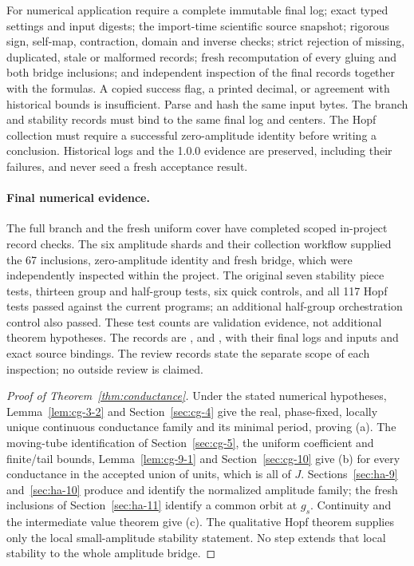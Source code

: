 \documentclass[11pt]{article}
\theoremstyle{definition}
\begin{document}
For numerical application require a complete immutable final log; exact typed settings and input digests; the import-time scientific source snapshot; rigorous sign, self-map, contraction, domain and inverse checks; strict rejection of missing, duplicated, stale or malformed records; fresh recomputation of every gluing and both bridge inclusions; and independent inspection of the final records together with the formulas. A copied success flag, a printed decimal, or agreement with historical bounds is insufficient. Parse and hash the same input bytes. The branch and stability records must bind to the same final log and centers. The Hopf collection must require a successful zero-amplitude identity before writing a conclusion. Historical logs and the 1.0.0 evidence are preserved, including their failures, and never seed a fresh acceptance result.

\paragraph{Final numerical evidence.} The full branch and the fresh uniform cover have completed scoped in-project record checks. The six amplitude shards and their collection workflow supplied the 67 inclusions, zero-amplitude identity and fresh bridge, which were independently inspected within the project. The original seven stability piece tests, thirteen group and half-group tests, six quick controls, and all 117 Hopf tests passed against the current programs; an additional half-group orchestration control also passed. These test counts are validation evidence, not additional theorem hypotheses. The records are ,  and , with their final logs and inputs and exact source bindings. The review records state the separate scope of each inspection; no outside review is claimed.

\begin{proof}[Proof of Theorem~\ref{thm:conductance}]
Under the stated numerical hypotheses, Lemma~\ref{lem:cg-3-2} and Section~\ref{sec:cg-4} give the real, phase-fixed, locally unique continuous conductance family and its minimal period, proving (a). The moving-tube identification of Section~\ref{sec:cg-5}, the uniform coefficient and finite/tail bounds, Lemma~\ref{lem:cg-9-1} and Section~\ref{sec:cg-10} give (b) for every conductance in the accepted union of units, which is all of $J$. Sections~\ref{sec:ha-9} and~\ref{sec:ha-10} produce and identify the normalized amplitude family; the fresh inclusions of Section~\ref{sec:ha-11} identify a common orbit at $g_s$. Continuity and the intermediate value theorem give (c). The qualitative Hopf theorem supplies only the local small-amplitude stability statement. No step extends that local stability to the whole amplitude bridge.
\end{proof}
\end{document}
